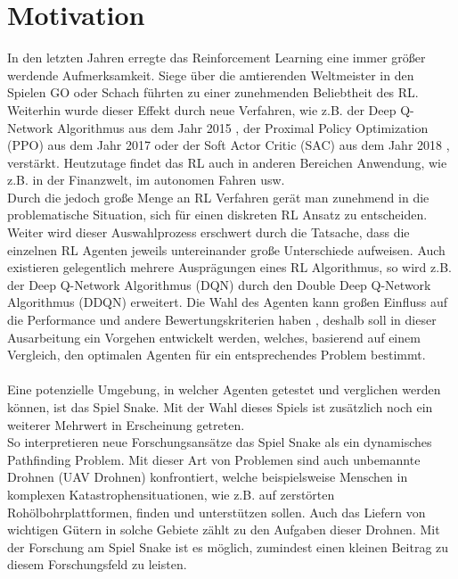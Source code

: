 \section{Motivation} \label{sec:Einleitung_Motivation}
In den letzten Jahren erregte das Reinforcement Learning eine immer größer werdende Aufmerksamkeit. Siege über die amtierenden Weltmeister in den Spielen GO oder Schach führten zu einer zunehmenden Beliebtheit des RL. Weiterhin wurde dieser Effekt durch neue Verfahren, wie z.B. der Deep Q-Network Algorithmus aus dem Jahr 2015 \citep{DQN}, der Proximal Policy Optimization (PPO) aus dem Jahr 2017 \citep{PPO} oder der Soft Actor Critic (SAC) aus dem Jahr 2018 \citep{SAC}, verstärkt. Heutzutage findet das RL auch in anderen Bereichen Anwendung, wie z.B. in der Finanzwelt, im autonomen Fahren usw.\\
Durch die jedoch große Menge an RL Verfahren gerät man zunehmend in die problematische Situation, sich für einen diskreten RL Ansatz zu entscheiden. Weiter wird dieser Auswahlprozess erschwert durch die Tatsache, dass die einzelnen RL Agenten jeweils untereinander große Unterschiede aufweisen. Auch existieren gelegentlich mehrere Ausprägungen eines RL Algorithmus, so wird z.B. der Deep Q-Network Algorithmus (DQN) durch den Double Deep Q-Network Algorithmus (DDQN) erweitert. Die Wahl des Agenten kann großen Einfluss auf die Performance und andere Bewertungskriterien haben \cite{Exploration_of_Reinforcement_Learning_to_SNAKE}, deshalb soll in dieser Ausarbeitung ein Vorgehen entwickelt werden, welches, basierend auf einem Vergleich, den optimalen Agenten für ein entsprechendes Problem bestimmt.\\
\\Eine potenzielle Umgebung, in welcher Agenten getestet und verglichen werden können, ist das Spiel Snake.
Mit der Wahl dieses Spiels ist zusätzlich noch ein weiterer Mehrwert in Erscheinung getreten.\\ 
So interpretieren neue Forschungsansätze das Spiel Snake als ein dynamisches Pathfinding Problem. Mit dieser Art von Problemen sind auch unbemannte Drohnen (UAV Drohnen) konfrontiert, welche beispielsweise Menschen in komplexen Katastrophensituationen, wie z.B. auf zerstörten Rohölbohrplattformen, finden und unterstützen sollen. 
Auch das Liefern von wichtigen Gütern in solche Gebiete zählt zu den Aufgaben dieser Drohnen.
Mit der Forschung am Spiel Snake ist es möglich, zumindest einen kleinen Beitrag zu diesem Forschungsfeld zu leisten. \citep{UAV}

